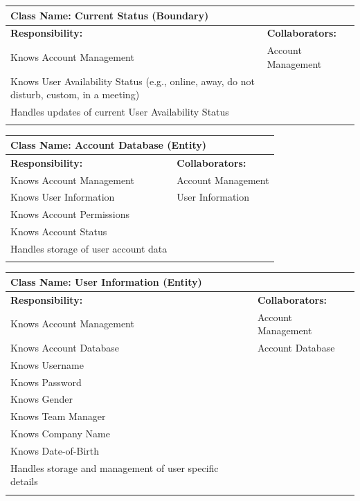 \documentclass[]{article}
\begin{document}
	\begin{table}[ht]
		\centering
		\begin{tabular}{|p{7cm}|p{7cm}|}
		\hline 
		 \multicolumn{2}{|l|}{\textbf{Class Name:} Current Status (Boundary)} \\
		\hline
		\textbf{Responsibility:} & \textbf{Collaborators:} \\
		\hline
			Knows Account Management & Account Management \\
			Knows User Availability Status (e.g., online, away, do not disturb, custom, in a meeting) &\\
			Handles updates of current User Availability Status &\\
		\vspace{0.1in} & \\
		\hline
		\end{tabular}
	\end{table}

	\begin{table}[ht]
		\centering
		\begin{tabular}{|p{7cm}|p{7cm}|}
		\hline 
		 \multicolumn{2}{|l|}{\textbf{Class Name:} Account Database (Entity)} \\
		\hline
		\textbf{Responsibility:} & \textbf{Collaborators:} \\
		\hline
			Knows Account Management & Account Management \\
			Knows User Information & User Information \\
			Knows Account Permissions &\\
			Knows Account Status &\\
			Handles storage of user account data &\\
		\vspace{0.1in} & \\
		\hline
		\end{tabular}
	\end{table}

	\begin{table}[ht]
		\centering
		\begin{tabular}{|p{7cm}|p{7cm}|}
		\hline 
		 \multicolumn{2}{|l|}{\textbf{Class Name:} User Information (Entity)} \\
		\hline
		\textbf{Responsibility:} & \textbf{Collaborators:} \\
		\hline

			Knows Account Management & Account Management \\
			Knows Account Database & Account Database \\
			Knows Username &\\
			Knows Password &\\
			Knows Gender &\\
			Knows Team Manager &\\
			Knows Company Name &\\
			Knows Date-of-Birth &\\
			Handles storage and management of user specific details &\\
		\vspace{0.1in} & \\
		\hline
		\end{tabular}
	\end{table}
\end{document}
